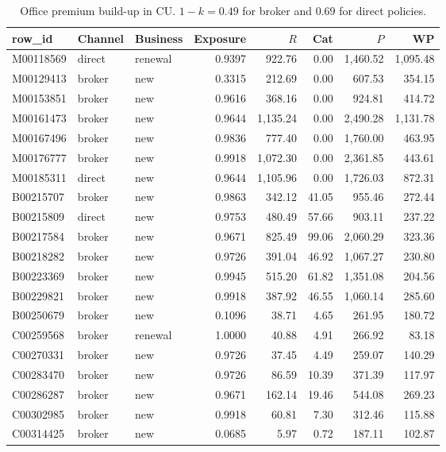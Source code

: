 \documentclass{rapport}
\begin{document}
\begin{table}[h]
\centering
\small
\begin{tabular}{lllrrrrr}
\hline
row\_id & Channel & Business & Exposure & $R$ & Cat & $P$ & WP\\
\hline
M00118569 & direct & renewal & 0.9397 & 922.76 & 0.00 & 1,460.52 & 1,095.48\\
M00129413 & broker & new & 0.3315 & 212.69 & 0.00 & 607.53 & 354.15\\
M00153851 & broker & new & 0.9616 & 368.16 & 0.00 & 924.81 & 414.72\\
M00161473 & broker & new & 0.9644 & 1,135.24 & 0.00 & 2,490.28 & 1,131.78\\
M00167496 & broker & new & 0.9836 & 777.40 & 0.00 & 1,760.00 & 463.95\\
M00176777 & broker & new & 0.9918 & 1,072.30 & 0.00 & 2,361.85 & 443.61\\
M00185311 & direct & new & 0.9644 & 1,105.96 & 0.00 & 1,726.03 & 872.31\\
B00215707 & broker & new & 0.9863 & 342.12 & 41.05 & 955.46 & 272.44\\
B00215809 & direct & new & 0.9753 & 480.49 & 57.66 & 903.11 & 237.22\\
B00217584 & broker & new & 0.9671 & 825.49 & 99.06 & 2,060.29 & 323.36\\
B00218282 & broker & new & 0.9726 & 391.04 & 46.92 & 1,067.27 & 230.80\\
B00223369 & broker & new & 0.9945 & 515.20 & 61.82 & 1,351.08 & 204.56\\
B00229821 & broker & new & 0.9918 & 387.92 & 46.55 & 1,060.14 & 285.60\\
B00250679 & broker & new & 0.1096 & 38.71 & 4.65 & 261.95 & 180.72\\
C00259568 & broker & renewal & 1.0000 & 40.88 & 4.91 & 266.92 & 83.18\\
C00270331 & broker & new & 0.9726 & 37.45 & 4.49 & 259.07 & 140.29\\
C00283470 & broker & new & 0.9726 & 86.59 & 10.39 & 371.39 & 117.97\\
C00286287 & broker & new & 0.9671 & 162.14 & 19.46 & 544.08 & 269.23\\
C00302985 & broker & new & 0.9918 & 60.81 & 7.30 & 312.46 & 115.88\\
C00314425 & broker & new & 0.0685 & 5.97 & 0.72 & 187.11 & 102.87\\
\hline
\end{tabular}
\caption{Office premium build-up in CU. $1-k = 0.49$ for broker and $0.69$ for direct policies.}
\label{ov:tab-op1}
\end{table}
\end{document}
